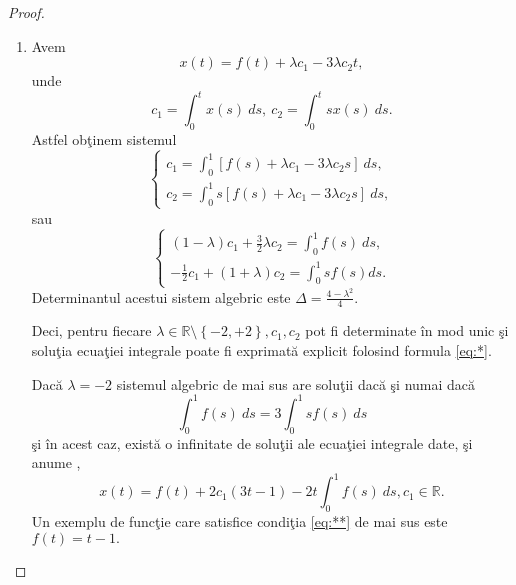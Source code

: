 \documentclass[a4paper,12pt,oneside]{report}
\begin{document}
\begin{proof}
\begin{enumerate}[label=(\alph*)]
  \item Avem
        \begin{displaymath}
        	x\left ( t \right ) = f \left ( t \right ) + \lambda c_{1} - 3 \lambda c_{2}t, \label{eq:*} \tag{*}
        \end{displaymath}
 unde
        \begin{displaymath}
        	c_{1} = \int_{0}^{t} x\left ( s \right ) \ ds,~c_{2} = \int_{0}^{t} sx\left ( s \right ) \ ds.
        \end{displaymath}
Astfel ob\c{t}inem sistemul 
        \begin{displaymath}
        	\left\{\begin{matrix}
        	c_{1} = \int_{0}^{1} \left [ f\left ( s \right ) + \lambda c_{1} - 3\lambda c_{2}s \right ]\ ds,\\
        	c_{2} = \int_{0}^{1}s \left [ f\left ( s \right ) + \lambda c_{1} - 3\lambda c_{2}s \right ]\ ds,
        	\end{matrix}\right.
        \end{displaymath}
 sau
 \begin{displaymath}
        	\left\{\begin{matrix}
        	\left ( 1 - \lambda  \right )c_{1} + \frac{3}{2}\lambda c_{2} = \int_{0}^{1}f\left ( s \right ) \ ds,\\
        	-\frac{1}{2}c_{1} + \left ( 1 + \lambda  \right )c_{2} = \int_{0}^{1}s f\left ( s \right ) ds.
        	\end{matrix}\right.
        \end{displaymath}
Determinantul acestui sistem algebric este \(\Delta  =  \frac{4 - \lambda ^{2} }{4}\).

Deci, pentru fiecare \(\lambda \in \mathbb{R} \setminus \left \{ -2,+2 \right \}, c_{1}, c_{2}\) pot fi determinate \^{i}n mod unic \c{s}i solu\c{t}ia ecua\c{t}iei integrale poate fi exprimat\u{a} explicit folosind formula \ref{eq:*}.

\noindent Dac\u{a} \(\lambda = -2\) sistemul algebric de mai sus are solu\c{t}ii dac\u{a} \c{s}i numai dac\u{a}
        \begin{displaymath}
        	\int_{0}^{1}f\left ( s \right ) \ ds  = 3\int_{0}^{1}sf\left ( s  \right )\ ds \label{eq:**} \tag{**}
        \end{displaymath}
\c{s}i \^{i}n acest caz, exist\u{a} o infinitate de solu\c{t}ii ale ecua\c{t}iei integrale date, \c{s}i anume ,
        \begin{displaymath}
        	x\left ( t \right ) = f\left ( t \right ) + 2c_{1}\left ( 3t-1 \right ) - 2t\int_{0}^{1}f\left ( s \right ) \ ds, c_{1 }\in \mathbb{R}.
        \end{displaymath}
Un exemplu de func\c{t}ie care satisfice condi\c{t}ia \ref{eq:**} de mai sus este \(f\left ( t  \right ) = t-1.\)


\end{enumerate}
\end{proof}
\end{document}
